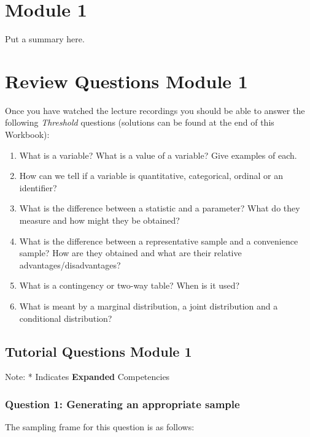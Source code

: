 \documentclass[
]{book}
\begin{document}
\chapter{Module 1}\label{module-1}

Put a summary here.

\chapter{Review Questions Module 1}\label{review-questions-module-1}

Once you have watched the lecture recordings you should be able to answer the following \emph{Threshold} questions (solutions can be found at the end of this Workbook):

\begin{enumerate}
\def\labelenumi{(\roman{enumi})}
\item
  What is a variable? What is a value of a variable? Give examples of each.
\item
  How can we tell if a variable is quantitative, categorical, ordinal or an identifier?
\item
  What is the difference between a statistic and a parameter? What do they measure
  and how might they be obtained?
\item
  What is the difference between a representative sample and a convenience
  sample? How are they obtained and what are their relative advantages/disadvantages?
\item
  What is a contingency or two-way table? When is it used?
\item
  What is meant by a marginal distribution, a joint distribution and a conditional
  distribution?
\end{enumerate}

\section{Tutorial Questions Module 1}\label{tutorial-questions-module-1}

Note: * Indicates \textbf{Expanded} Competencies

\subsection{Question 1: Generating an appropriate sample}\label{question-1-generating-an-appropriate-sample}

The sampling frame for this question is as follows:
\end{document}
